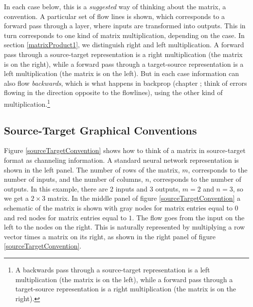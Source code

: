 In each case below, this is a \emph{suggested} way of thinking about the matrix, a convention. A particular set of flow lines is shown, which corresponds to a forward pass through a layer, where inputs are transformed into outputs. This in turn corresponds to one kind of matrix multiplication, depending on the case. In section \ref{matrixProduct1}, we distinguish right and left multiplication. A forward pass through a source-target representation is a right multiplication (the matrix is on the right), while a forward pass through a target-source representation is a left multiplication (the matrix is on the left). But in each case information can also flow \emph{backwards}, which is what happens in backprop (chapter ; think of errors flowing in the direction opposite to the flowlines), using the other kind of multiplication.\footnote{A backwards pass through a source-target representation is a left multiplication (the matrix is on the left), while a forward pass through a target-source representation is a right multiplication (the matrix is on the right).}

\subsection{Source-Target Graphical Conventions}

   Figure \ref{sourceTargetConvention} shows how to think of a matrix in 
source-target format as channeling information. A standard neural network representation is shown in
the left panel. The number of rows of the matrix, $m$, corresponds to the 
number of inputs, and the number of columns, $n$, corresponds to the number of 
outputs. In this example, there are 2 inputs and 3 outputs, $m=2$ and $n=3$, 
so we get a $2 \times 3$ matrix. In the middle panel of figure 
\ref{sourceTargetConvention} a schematic of the matrix is shown with gray nodes 
for matrix entries equal to $0$ and red nodes for matrix entries equal to $1$.
The flow goes from the input on the left to the nodes on the right. This is 
naturally represented by multiplying a row vector times a matrix on its right,
as shown in the right panel of figure \ref{sourceTargetConvention}. 


